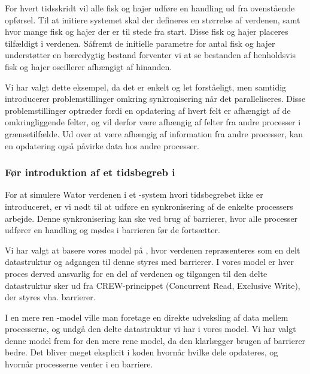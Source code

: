 For hvert tidsskridt vil alle fisk og hajer udføre en handling ud fra
ovenstående opførsel.
Til at initiere systemet skal der defineres en størrelse af verdenen,
samt hvor mange fisk og hajer der er til stede fra start. Disse fisk og
hajer placeres tilfældigt i verdenen.
Såfremt de initielle parametre for antal fisk og hajer understøtter en 
bæredygtig bestand forventer vi at se bestanden af henholdsvis fisk og hajer 
oscillerer afhængigt af hinanden.

Vi har valgt dette eksempel, da det er enkelt og let forståeligt, men samtidig 
introducerer problemstillinger omkring synkronisering når det paralleliseres.  
Disse problemstillinger optræder fordi en opdatering af hvert felt er afhængigt 
af de omkringliggende felter, og vil derfor være afhængig af felter fra andre 
processer i grænsetilfælde. Ud over at være afhængig af information fra andre 
processer, kan en opdatering også påvirke data hos andre processer.   

\subsubsection{Før introduktion af et tidsbegreb i \csp} For at simulere Wator 
verdenen i et \csp-system hvori tidsbegrebet ikke er introduceret, er vi nødt 
til at udføre en synkronisering af de enkelte processers arbejde. Denne 
synkronisering kan ske ved brug af barrierer, hvor alle processer udfører en 
handling og mødes i barrieren før de fortsætter.

Vi har valgt at basere vores model på \cite{crew}, hvor verdenen repræsenteres 
som en delt datastruktur og adgangen til denne styres med barrierer. I vores 
model er hver proces derved ansvarlig for en del af verdenen og tilgangen til 
den delte datastruktur sker ud fra CREW-princippet (Concurrent Read, Exclusive 
Write)\cite[5]{crew}, der styres vha. barrierer.  

I en mere ren \csp-model ville man foretage en direkte udveksling af data mellem 
processerne, og undgå den delte datastruktur vi har i vores model.  Vi har 
valgt denne model frem for den mere rene \csp model, da den klarlægger brugen af 
barrierer bedre.  Det bliver meget eksplicit i koden hvornår hvilke dele 
opdateres, og hvornår processerne venter i en barriere.

